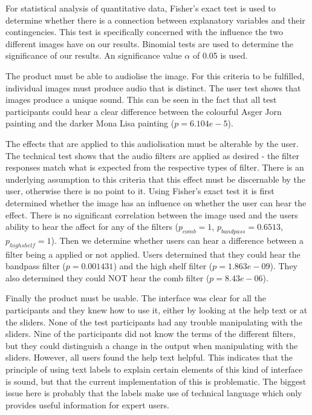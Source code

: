 For statistical analysis of quantitative data, Fisher's exact test is used to determine whether there is a connection between explanatory variables and their contingencies. This test is specifically concerned with the influence the two different images have on our results. Binomial tests are used to determine the significance of our results. An significance value $\alpha$ of 0.05 is used.

The product must be able to audiolise the image. For this criteria to be fulfilled, individual images must produce audio that is distinct. The user test shows that images produce a unique sound. This can be seen in the fact that all test participants could hear a clear difference between the colourful Asger Jorn painting and the darker Mona Lisa painting ($p=6.104e-5$). 

The effects that are applied to this audiolisation must be alterable by the user. The technical test shows that the audio filters are applied as desired - the filter responses match what is expected from the respective types of filter. There is an underlying assumption to this criteria that this effect must be discernable by the user, otherwise there is no point to it. Using Fisher's exact test it is first determined whether the image has an influence on whether the user can hear the effect. There is no significant correlation between the image used and the users ability to hear the affect for any of the filters ($p_{comb}=1$, $p_{bandpass}=0.6513$, $p_{highshelf}=1$). Then we determine whether users can hear a difference between a filter being a applied or not applied. Users determined that they could hear the bandpass filter ($p=0.001431$) and the high shelf filter ($p=1.863e-09$). They also determined they could NOT hear the comb filter ($p=8.43e-06$).

Finally the product must be usable. The interface was clear for all the participants and they knew how to use it, either by looking at the help text or at the sliders. None of the test participants had any trouble manipulating with the sliders. Nine of the participants did not know the terms of the different filters, but they could distinguish a change in the output when manipulating with the sliders. However, all users found the help text helpful. This indicates that the principle of using text labels to explain certain elements of this kind of interface is sound, but that the current implementation of this is problematic. The biggest issue here is probably that the labels make use of technical language which only provides useful information for expert users.
 

